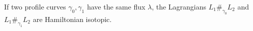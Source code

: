 
 
 
If two profile curves $\gamma_0, \gamma_1$ have the same flux $\lambda$, the Lagrangians $L_1\#_{\gamma_0} L_2$ and $L_1\#_{\gamma_1} L_2$ are Hamiltonian isotopic. 

 